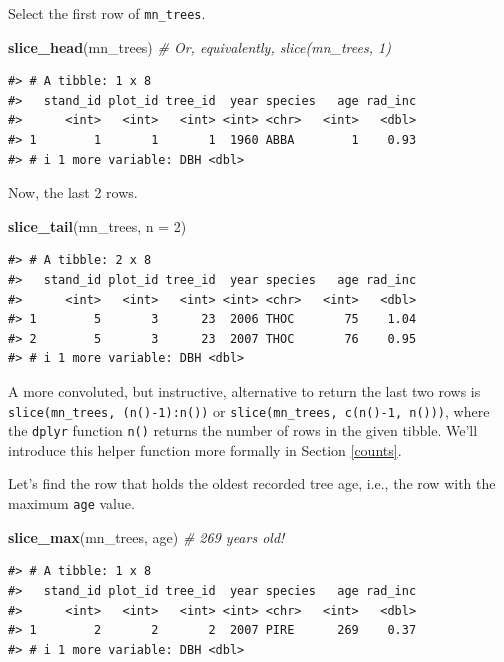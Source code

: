 \documentclass[
  11pt,
]{krantz}
\newenvironment{Shaded}{\begin{snugshade}}{\end{snugshade}}
\newcommand{\CommentTok}[1]{\textcolor[rgb]{0.56,0.35,0.01}{\textit{#1}}}
\newcommand{\DataTypeTok}[1]{\textcolor[rgb]{0.13,0.29,0.53}{#1}}
\newcommand{\DecValTok}[1]{\textcolor[rgb]{0.00,0.00,0.81}{#1}}
\newcommand{\KeywordTok}[1]{\textcolor[rgb]{0.13,0.29,0.53}{\textbf{#1}}}
\newcommand{\NormalTok}[1]{#1}
\theoremstyle{definition}
\theoremstyle{definition}
\theoremstyle{definition}
\theoremstyle{definition}
\theoremstyle{remark}
\begin{document}
Select the first row of \texttt{mn\_trees}.

\begin{Shaded}
\begin{Highlighting}[]
\KeywordTok{slice\_head}\NormalTok{(mn\_trees) }\CommentTok{\# Or, equivalently, slice(mn\_trees, 1)}
\end{Highlighting}
\end{Shaded}

\begin{verbatim}
#> # A tibble: 1 x 8
#>   stand_id plot_id tree_id  year species   age rad_inc
#>      <int>   <int>   <int> <int> <chr>   <int>   <dbl>
#> 1        1       1       1  1960 ABBA        1    0.93
#> # i 1 more variable: DBH <dbl>
\end{verbatim}

Now, the last 2 rows.

\begin{Shaded}
\begin{Highlighting}[]
\KeywordTok{slice\_tail}\NormalTok{(mn\_trees, }\DataTypeTok{n =} \DecValTok{2}\NormalTok{)}
\end{Highlighting}
\end{Shaded}

\begin{verbatim}
#> # A tibble: 2 x 8
#>   stand_id plot_id tree_id  year species   age rad_inc
#>      <int>   <int>   <int> <int> <chr>   <int>   <dbl>
#> 1        5       3      23  2006 THOC       75    1.04
#> 2        5       3      23  2007 THOC       76    0.95
#> # i 1 more variable: DBH <dbl>
\end{verbatim}

A more convoluted, but instructive, alternative to return the last two rows is \texttt{slice(mn\_trees,\ (n()-1):n())} or \texttt{slice(mn\_trees,\ c(n()-1,\ n()))}, where the \texttt{dplyr} function \texttt{n()} returns the number of rows in the given tibble. We'll introduce this helper function more formally in Section \ref{counts}.

Let's find the row that holds the oldest recorded tree age, i.e., the row with the maximum \texttt{age} value.

\begin{Shaded}
\begin{Highlighting}[]
\KeywordTok{slice\_max}\NormalTok{(mn\_trees, age) }\CommentTok{\# 269 years old!}
\end{Highlighting}
\end{Shaded}

\begin{verbatim}
#> # A tibble: 1 x 8
#>   stand_id plot_id tree_id  year species   age rad_inc
#>      <int>   <int>   <int> <int> <chr>   <int>   <dbl>
#> 1        2       2       2  2007 PIRE      269    0.37
#> # i 1 more variable: DBH <dbl>
\end{verbatim}
\end{document}
